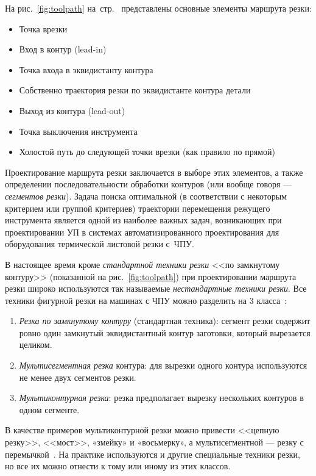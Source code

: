 На рис.~\ref{fig:toolpath}
на~стр.~\pageref{fig:toolpath}
представлены основные элементы маршрута резки:
\begin{itemize}
  \item Точка врезки
  \item Вход в контур (lead-in)
  \item Точка входа в эквидистанту контура
  \item Собственно траектория резки по эквидистанте контура детали
  \item Выход из контура (lead-out)
  \item Точка выключения инструмента
  \item Холостой путь до следующей точки врезки
  (как правило по прямой)
\end{itemize}

Проектирование маршрута резки заключается в выборе
этих элементов,
а также определении последовательности обработки контуров
(или вообще говоря --- \textit{сегментов резки}).
Задача поиска оптимальной
(в соответствии с некоторым критерием или группой критериев)
траектории перемещения режущего
инструмента является одной из наиболее
важных задач, возникающих при проектировании УП
в системах автоматизированного проектирования для
оборудования термической листовой резки
с~ЧПУ.

В настоящее время кроме \textit{стандартной техники резки}
<<по замкнутому контуру>>
(показанной на рис.~\ref{fig:toolpath})
при проектировании маршрута резки широко используются
так называемые
\textit{нестандартные техники резки}.
Все техники фигурной резки на
машинах с ЧПУ можно разделить на 3 класса~\cite{bi:Petunin2015}:
\begin{enumerate}
  \item \textit{Резка по замкнутому контуру}
  (стандартная техника):
  сегмент резки содержит ровно один замкнутый эквидистантный контур
  заготовки, который вырезается целиком.
  \item \textit{Мультисегментная резка} контура:
  для вырезки одного
  контура используются не менее двух сегментов резки.
  \item \textit{Мультиконтурная резка}:
  резка предполагает вырезку нескольких контуров в одном сегменте.
\end{enumerate}

В качестве примеров мультиконтурной резки можно привести
<<цепную резку>>, <<мост>>, «змейку» и «восьмерку»,
а  мультисегментной --- резку с перемычкой~\cite{bi:book2020}.
На практике используются и другие специальные техники резки,
но все их можно отнести к тому или иному из этих классов.

